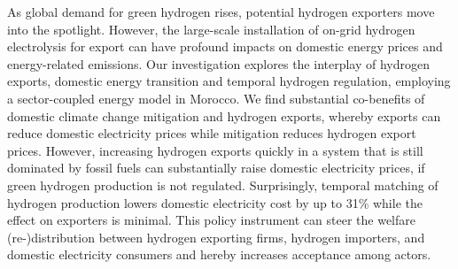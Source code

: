 
As global demand for green hydrogen rises, potential hydrogen exporters move into the spotlight.
However, the large-scale installation of on-grid hydrogen electrolysis for export can have profound impacts on domestic energy prices and energy-related emissions.
Our investigation explores the interplay of hydrogen exports, domestic energy transition and temporal hydrogen regulation, employing a sector-coupled energy model in Morocco. 
We find substantial co-benefits of domestic climate change mitigation and hydrogen exports, whereby exports can reduce domestic electricity prices while mitigation reduces hydrogen export prices.
However, increasing hydrogen exports quickly in a system that is still dominated by fossil fuels can substantially raise domestic electricity prices, if green hydrogen production is not regulated.
Surprisingly, temporal matching of hydrogen production lowers domestic electricity cost by up to 31\% while the effect on exporters is minimal. 
This policy instrument can steer the welfare (re-)distribution between hydrogen exporting firms, hydrogen importers, and domestic electricity consumers and hereby increases acceptance among actors.